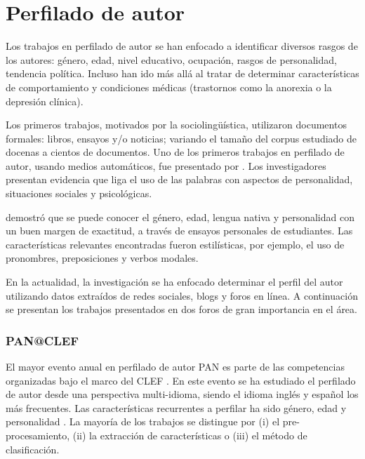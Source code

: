 \section{Perfilado de autor}
Los trabajos en perfilado de autor se han enfocado a identificar diversos rasgos de los autores: género, edad, nivel educativo, ocupación, rasgos de personalidad, tendencia política. Incluso han ido más allá al tratar de determinar características de comportamiento y condiciones médicas (trastornos como la anorexia o la depresión clínica). 

Los primeros trabajos, motivados por la sociolingüística, utilizaron documentos formales: libros, ensayos y/o noticias; variando el tamaño del corpus estudiado de docenas a cientos de documentos. 
Uno de los primeros trabajos en perfilado de autor, usando medios automáticos, fue presentado por \citep{Pennebaker2002}. Los investigadores presentan evidencia que liga el uso de las palabras con aspectos de personalidad, situaciones sociales y psicológicas.

\citep{Argamon2009} demostró que se puede conocer el género, edad, lengua nativa y personalidad con un buen margen de exactitud, a través de ensayos personales de estudiantes. Las características relevantes encontradas fueron estilísticas, por ejemplo, el uso de pronombres, preposiciones y verbos modales. 

En la actualidad, la investigación se ha enfocado determinar el perfil del autor utilizando datos extraídos de redes sociales, blogs y foros en línea. A continuación se presentan los trabajos presentados en dos foros de gran importancia en el área. 

\subsubsection{PAN@CLEF}
El mayor evento anual en perfilado de autor PAN es parte de las competencias organizadas bajo el marco del CLEF \citep{Rangel2013b, Rangel2019}. En este evento se ha estudiado el perfilado de autor desde una perspectiva multi-idioma, siendo el idioma inglés y español los más frecuentes. Las características recurrentes a perfilar ha sido género, edad \citep{Rangel2013b, Rangel2019, Rangel2016b} y personalidad \citep{Stammatatos2015}.
La mayoría de los trabajos se distingue por (i) el pre-procesamiento, (ii) la extracción de características o (iii) el método de clasificación.

